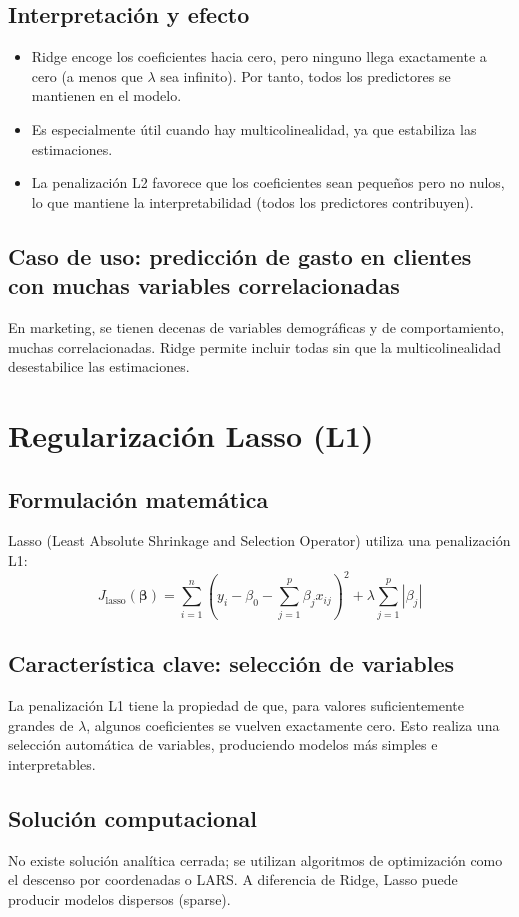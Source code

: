 \documentclass[12pt,a4paper,openany,oneside]{book}
\begin{document}
\subsection{Interpretación y efecto}
\begin{itemize}
    \item Ridge encoge los coeficientes hacia cero, pero ninguno llega exactamente a cero (a menos que \(\lambda\) sea infinito). Por tanto, todos los predictores se mantienen en el modelo.
    \item Es especialmente útil cuando hay multicolinealidad, ya que estabiliza las estimaciones.
    \item La penalización L2 favorece que los coeficientes sean pequeños pero no nulos, lo que mantiene la interpretabilidad (todos los predictores contribuyen).
\end{itemize}

\subsection{Caso de uso: predicción de gasto en clientes con muchas variables correlacionadas}
En marketing, se tienen decenas de variables demográficas y de comportamiento, muchas correlacionadas. Ridge permite incluir todas sin que la multicolinealidad desestabilice las estimaciones.

\section{Regularización Lasso (L1)}
\subsection{Formulación matemática}
Lasso (Least Absolute Shrinkage and Selection Operator) utiliza una penalización L1:
\[
J_{\text{lasso}}(\boldsymbol{\beta}) = \sum_{i=1}^n (y_i - \beta_0 - \sum_{j=1}^p \beta_j x_{ij})^2 + \lambda \sum_{j=1}^p |\beta_j|
\]

\subsection{Característica clave: selección de variables}
La penalización L1 tiene la propiedad de que, para valores suficientemente grandes de \(\lambda\), algunos coeficientes se vuelven exactamente cero. Esto realiza una selección automática de variables, produciendo modelos más simples e interpretables.

\subsection{Solución computacional}
No existe solución analítica cerrada; se utilizan algoritmos de optimización como el descenso por coordenadas o LARS. A diferencia de Ridge, Lasso puede producir modelos dispersos (sparse).
\end{document}
